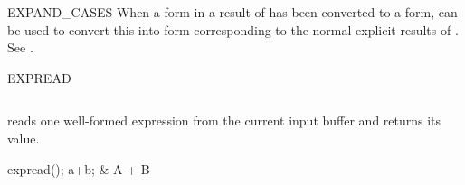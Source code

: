\begin{Operator}{EXPAND\_CASES}
When a  form in a result of  
has been converted to a  form, 
can be used to convert this into form corresponding to the
normal explicit results of . See .
\end{Operator}

\begin{Operator}{EXPREAD}
\begin{Syntax}
\(\)
\end{Syntax}

 reads one well-formed expression from the current input
buffer and returns its value.

\begin{Examples}
expread(); a+b;  & A + B
\end{Examples}

\end{Operator}


